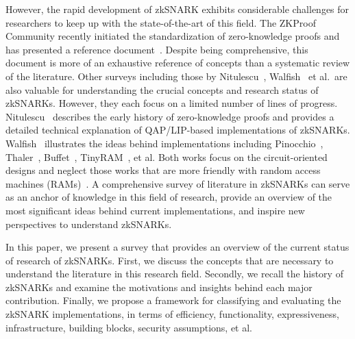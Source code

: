 \documentclass[12pt]{article}
\theoremstyle{plain}
\theoremstyle{definition}
\theoremstyle{remark}
\begin{document}
However, the rapid development of zkSNARK exhibits considerable challenges for researchers to keep up with the state-of-the-art of this field.
The ZKProof Community recently initiated the standardization of zero-knowledge proofs and has presented a reference document~\cite{ZKProof20}.
Despite being comprehensive, this document is more of an exhaustive reference of concepts than a systematic review of the literature.
Other surveys including those by Nitulescu~\cite{nitulescu19gentle}, Walfish~\cite{WalfishB15} et al.\ are also valuable for understanding the crucial concepts and research status of zkSNARKs.
However, they each focus on a limited number of lines of progress.
Nitulescu~\cite{nitulescu19gentle} describes the early history of zero-knowledge proofs and provides a detailed technical explanation of QAP/LIP-based implementations of zkSNARKs.
Walfish~\cite{WalfishB15} illustrates the ideas behind implementations including Pinocchio~\cite{ParnoHG013}, Thaler~\cite{Thaler13}, Buffet~\cite{WahbySRBW15}, TinyRAM~\cite{Ben-SassonCGTV13, Ben-SassonCTV14}, et al.
Both works focus on the circuit-oriented designs and neglect those works that are more friendly with random access machines (RAMs)~\cite{Ben-SassonCGTV13, Ben-SassonCGV16, Ben-SassonBHR18}.
A comprehensive survey of literature in zkSNARKs can serve as an anchor of knowledge in this field of research, provide an overview of the most significant ideas behind current implementations, and inspire new perspectives to understand zkSNARKs.

In this paper, we present a survey that provides an overview of the current status of research of zkSNARKs.
First, we discuss the concepts that are necessary to understand the literature in this research field.
Secondly, we recall the history of zkSNARKs and examine the motivations and insights behind each major contribution.
Finally, we propose a framework for classifying and evaluating the zkSNARK implementations, in terms of efficiency, functionality, expressiveness, infrastructure, building blocks, security assumptions, et al.


\end{document}
